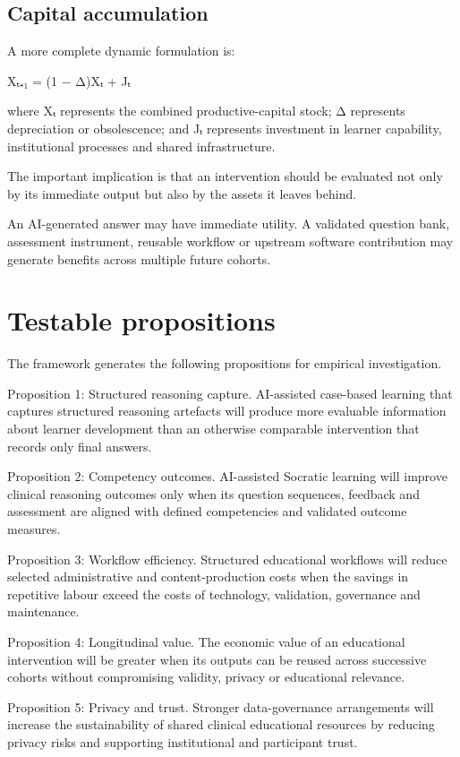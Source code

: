 \documentclass[11pt,a4paper]{article}
\begin{document}
\subsection{Capital accumulation}
A more complete dynamic formulation is:

Xₜ₊₁ = (1 − Δ)Xₜ + Jₜ

where Xₜ represents the combined productive-capital stock; Δ represents depreciation or obsolescence; and Jₜ represents investment in learner capability, institutional processes and shared infrastructure.

The important implication is that an intervention should be evaluated not only by its immediate output but also by the assets it leaves behind.

An AI-generated answer may have immediate utility. A validated question bank, assessment instrument, reusable workflow or upstream software contribution may generate benefits across multiple future cohorts.

\section{Testable propositions}
The framework generates the following propositions for empirical investigation.

Proposition 1: Structured reasoning capture. AI-assisted case-based learning that captures structured reasoning artefacts will produce more evaluable information about learner development than an otherwise comparable intervention that records only final answers.

Proposition 2: Competency outcomes. AI-assisted Socratic learning will improve clinical reasoning outcomes only when its question sequences, feedback and assessment are aligned with defined competencies and validated outcome measures.

Proposition 3: Workflow efficiency. Structured educational workflows will reduce selected administrative and content-production costs when the savings in repetitive labour exceed the costs of technology, validation, governance and maintenance.

Proposition 4: Longitudinal value. The economic value of an educational intervention will be greater when its outputs can be reused across successive cohorts without compromising validity, privacy or educational relevance.

Proposition 5: Privacy and trust. Stronger data-governance arrangements will increase the sustainability of shared clinical educational resources by reducing privacy risks and supporting institutional and participant trust.
\end{document}
